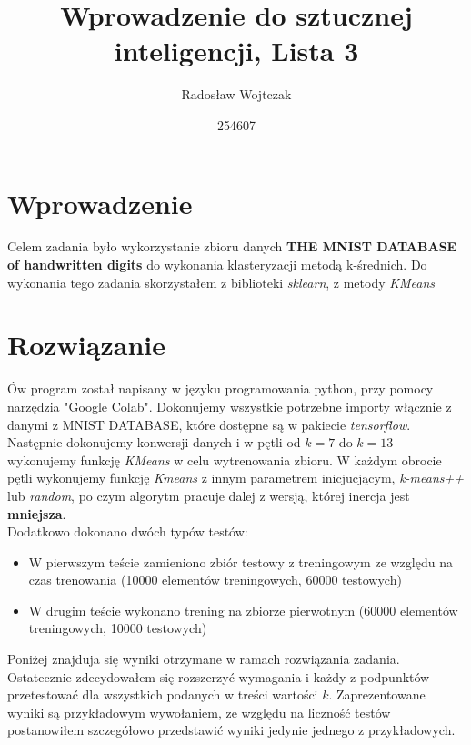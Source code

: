 \documentclass[a4paper,14pt]{report}
\title{Wprowadzenie do sztucznej inteligencji, Lista 3}
\author{Radosław Wojtczak}
\date{254607}
\begin{document}
\maketitle
\section{Wprowadzenie}
	Celem zadania było wykorzystanie zbioru danych \textbf{THE MNIST DATABASE of handwritten digits} do wykonania klasteryzacji metodą k-średnich. Do wykonania tego zadania skorzystałem z biblioteki \textit{sklearn}, z metody \textit{KMeans}
\section{Rozwiązanie}
	Ów program został napisany w języku programowania python, przy pomocy narzędzia "Google Colab".
	Dokonujemy wszystkie potrzebne importy włącznie z danymi z MNIST DATABASE, które dostępne są w pakiecie \textit{tensorflow}. Następnie dokonujemy konwersji danych i w pętli od $k=7$ do $k=13$ wykonujemy funkcję \textit{KMeans} w celu wytrenowania zbioru. W każdym obrocie pętli wykonujemy funkcję \textit{Kmeans} z innym parametrem inicjucjącym, \textit{k-means++} lub \textit{random}, po czym algorytm pracuje dalej z wersją, której inercja jest \textbf{mniejsza}. \\
	Dodatkowo dokonano dwóch typów testów:
	\begin{itemize}
		\item W pierwszym teście zamieniono zbiór testowy z treningowym ze względu na czas trenowania (10000 elementów treningowych, 60000 testowych)
		\item W drugim teście wykonano trening na zbiorze pierwotnym (60000 elementów treningowych, 10000 testowych)
	\end{itemize}
	Poniżej znajduja się wyniki otrzymane w ramach rozwiązania zadania. Ostatecznie zdecydowałem się rozszerzyć wymagania i każdy z podpunktów przetestować dla wszystkich podanych w treści wartości $k$.
	Zaprezentowane wyniki są przykładowym wywołaniem, ze względu na liczność testów postanowiłem szczegółowo przedstawić wyniki jedynie jednego z przykładowych.
\end{document}
